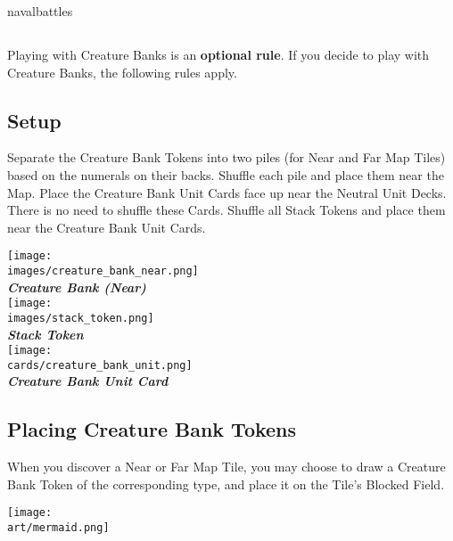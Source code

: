 \pagebreak
\begin{expansion}[before=\vspace*{-11mm}]{navalbattles}
\begin{multicols*}{2}
  \subsection*{}
   Playing with Creature Banks is an \textbf{optional rule}.
   If you decide to play with Creature Banks, the following rules apply.

   \bigskip
   \subsection*{Setup}
   Separate the Creature Bank Tokens into two piles (for Near and Far Map Tiles) based on the numerals on their backs.
   Shuffle each pile and place them near the Map.
   Place the Creature Bank Unit Cards face up near the Neutral Unit Decks.
   There is no need to shuffle these Cards.
   Shuffle all Stack Tokens and place them near the Creature Bank Unit Cards.

    \bigskip
    \begin{multicols*}{2}
      \begin{center}
        \texttt{[image: \\images/creature\_bank\_near.png]}\\
        \vspace{-0.5em}\textbf{\footnotesize\textit{\textcolor{darkcandyapplered}{Creature Bank (Near)}}}\\
        \vspace*{\fill}
        \texttt{[image: \\images/stack\_token.png]}\\
        \textbf{\footnotesize\textit{\textcolor{darkcandyapplered}{Stack Token}}}\\
        \columnbreak
        \texttt{[image: \\cards/creature\_bank\_unit.png]}\\
        \textbf{\footnotesize\textit{\textcolor{darkcandyapplered}{Creature Bank Unit Card}}}
      \end{center}
    \end{multicols*}

  \subsection*{Placing Creature Bank Tokens}
  When you discover a Near or Far Map Tile, you may choose to draw a Creature Bank Token of the corresponding type, and place it on the Tile's Blocked Field.\par
  \vspace*{1em}
  {\hspace*{-2em}\texttt{[image: \\art/mermaid.png]}}
  \columnbreak


\end{multicols*}
\end{expansion}
